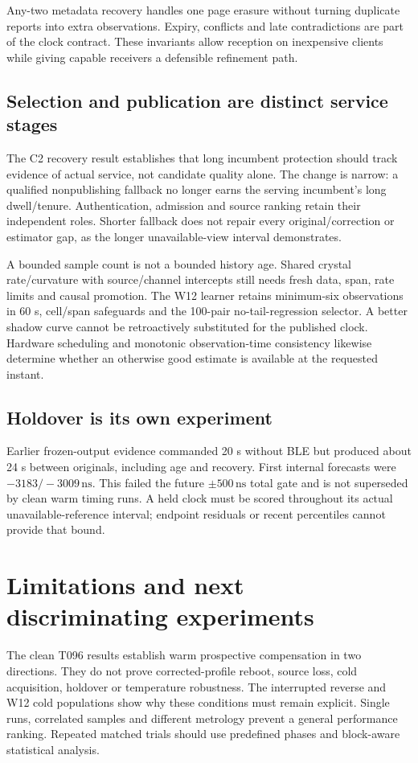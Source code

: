 \documentclass[11pt,letterpaper]{article}
\newcommand{\ns}{\,\mathrm{ns}}
\newcommand{\page}{\clearpage}
\begin{document}
Any-two metadata recovery handles one page erasure without turning duplicate reports into extra observations. Expiry, conflicts and late contradictions are part of the clock contract. These invariants allow reception on inexpensive clients while giving capable receivers a defensible refinement path.

\subsection{Selection and publication are distinct service stages}
The C2 recovery result establishes that long incumbent protection should track evidence of actual service, not candidate quality alone. The change is narrow: a qualified nonpublishing fallback no longer earns the serving incumbent's long dwell/tenure. Authentication, admission and source ranking retain their independent roles. Shorter fallback does not repair every original/correction or estimator gap, as the longer unavailable-view interval demonstrates.

A bounded sample count is not a bounded history age. Shared crystal rate/curvature with source/channel intercepts still needs fresh data, span, rate limits and causal promotion. The W12 learner retains minimum-six observations in 60 s, cell/span safeguards and the 100-pair no-tail-regression selector. A better shadow curve cannot be retroactively substituted for the published clock. Hardware scheduling and monotonic observation-time consistency likewise determine whether an otherwise good estimate is available at the requested instant.

\subsection{Holdover is its own experiment}
Earlier frozen-output evidence commanded 20 s without BLE but produced about 24 s between originals, including age and recovery. First internal forecasts were $-3183/-3009\ns$. This failed the future $\pm500\ns$ total gate and is not superseded by clean warm timing runs. A held clock must be scored throughout its actual unavailable-reference interval; endpoint residuals or recent percentiles cannot provide that bound.
\page
\section{Limitations and next discriminating experiments}
The clean T096 results establish warm prospective compensation in two directions. They do not prove corrected-profile reboot, source loss, cold acquisition, holdover or temperature robustness. The interrupted reverse and W12 cold populations show why these conditions must remain explicit. Single runs, correlated samples and different metrology prevent a general performance ranking. Repeated matched trials should use predefined phases and block-aware statistical analysis.
\end{document}
